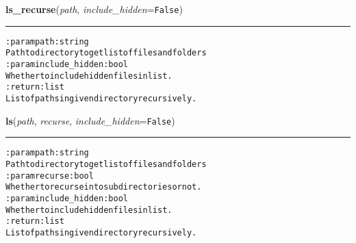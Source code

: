     \vspace{0.5ex}

\hspace{.8\funcindent}\begin{boxedminipage}{\funcwidth}

    \raggedright \textbf{ls\_recurse}(\textit{path}, \textit{include\_hidden}={\tt False})

    \vspace{-1.5ex}

    \rule{\textwidth}{0.5\fboxrule}
\setlength{\parskip}{2ex}
\begin{alltt}

:param path: string
    Path to directory to get list of files and folders
:param include\_hidden: bool
    Whether to include hidden files in list.
:return: list
    List of paths in given directory recursively.
\end{alltt}

\setlength{\parskip}{1ex}
    \end{boxedminipage}

    \label{hal:files:models:FileSystem:ls}

    \vspace{0.5ex}

\hspace{.8\funcindent}\begin{boxedminipage}{\funcwidth}

    \raggedright \textbf{ls}(\textit{path}, \textit{recurse}, \textit{include\_hidden}={\tt False})

    \vspace{-1.5ex}

    \rule{\textwidth}{0.5\fboxrule}
\setlength{\parskip}{2ex}
\begin{alltt}

:param path: string
    Path to directory to get list of files and folders
:param recurse: bool
    Whether to recurse into subdirectories or not.
:param include\_hidden: bool
    Whether to include hidden files in list.
:return: list
    List of paths in given directory recursively.
\end{alltt}

\setlength{\parskip}{1ex}
    \end{boxedminipage}

    \label{hal:files:models:FileSystem:is_archive_mac}

